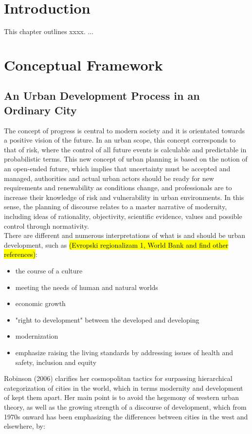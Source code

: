 \documentclass[11pt]{report}
\begin{document}
\section{Introduction}

This chapter outlines xxxx. ...

\section{Conceptual Framework}

\subsection{An Urban Development Process in an Ordinary City}
The concept of progress is central to modern society and it is orientated towards a positive vision of the future. In an urban scope, this concept corresponds to that of risk, where the control of all future events is calculable and predictable in probabilistic terms. This new concept of urban planning is based on the notion of an open-ended future, which implies that uncertainty must be accepted and managed, authorities and actual urban actors should be ready for new requirements and renewability as conditions change, and professionals are to increase their knowledge of risk and vulnerability in urban environments. In this sense, the planning of discourse relates to a master narrative of modernity, including ideas of rationality, objectivity, scientific evidence, values and possible control through normativity.
\\
There are different and numerous interpretations of what is and should be urban development, such as \hl{(Evropski regionalizam 1, World Bank and find other references)}:
\begin{itemize}
\item the course of a culture
\item meeting the needs of human and natural worlds
\item economic growth
\item "right to development" between the developed and developing
\item modernization
\item emphasize raising the living standards by addressing issues of health and safety, inclusion and equity
\end{itemize}  
Robinson (2006) clarifies   her  cosmopolitan  tactics  for  surpassing  hierarchical categorization of cities in the world, which in terms modernity and development of kept them apart. Her main point is to avoid the hegemony of western urban theory, as  well as the growing  strength of a discourse of development, which from 1970s onward has been emphasizing the differences between cities in the west and elsewhere, by: 
\end{document}
